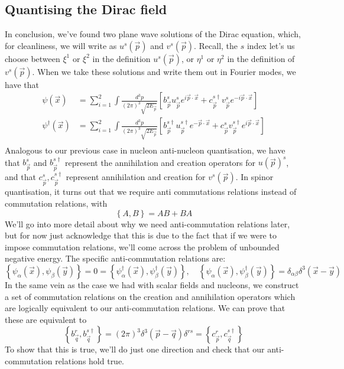 \subsection{Quantising the Dirac field}
In conclusion, we've found two 
plane wave solutions of the Dirac equation, which, for 
cleanliness, we will write as 
$ u ^ s (\vec{p} )  $ and $ v ^s ( \vec{p} )$. 
Recall, the $ s $ index let's us choose between 
$ \xi ^ 1  $  or $ \xi ^ 2 $ in the definition $ u^ s ( \vec{p} )$, 
or $ \eta ^ 1 $ or $ \eta ^ 2 $ in the definition of $  v ^ s ( \vec{p} ) $.  
When we take these solutions and write them out 
in Fourier modes, we have that 
\begin{align*}
\psi ( \vec{x} ) &=  \sum _{ i = 1 } ^ 2 
\int \frac{ d^ 3 p }{ ( 2 \pi ) ^ 3 \sqrt{ 2 E_{ \vec{p} } }  } \left[  
b_{ \vec{p} } ^ s u _{ \vec{p} } ^ s e ^{ i \vec{p} \cdot  \vec{x} } 
+ c_{ \vec{p} } ^{ s \dagger } v_{ \vec{p} } ^ s e ^{ - i \vec{p} \cdot  \vec{x}}\right] \\
\psi ^ \dagger ( \vec{x} ) &=  \sum _{ i = 1 } ^ 2 
\int \frac{ d ^ 3 p }{ ( 2 \pi ) ^ 3 \sqrt{ 2 E _{ \vec{p} } }  } \left[  
	b_{ \vec{p} } ^ { s \dagger }  u_{\vec{p} } ^{ s \dagger } e ^{ - \vec{p} \cdot  \vec{x} } + 
c_{ \vec{p} } ^ s v_{ \vec{p}} ^{ s \dagger } e ^{ i \vec{p} \cdot  \vec{x} } \right] \\ 
\end{align*}
Analogous to our previous case in 
nucleon anti-nucleon quantisation, we have that
$ b_{\vec{p} }^ s $  and $ b_{\vec{p} } ^{ s \dagger } $ 
represent the annihilation and creation 
operators for $ u( \vec{p} ) ^ s $, and that $  c_{ \vec{p} } ^ s , 
c_{ \vec{p} } ^{ s \dagger } $  represent annihilation 
and creation for $ v ^ s ( \vec{p} ) $. 
In spinor quantisation, it turns out that we require 
anti commutations relations instead of commutation relations, with 
\[
\left\{  A, B  \right\}   = AB + B A 
\] We'll go into more detail about why we 
need anti-commutation relations later, 
but for now just acknowledge that this is due to the fact that 
if we were to impose commutation relations, 
we'll come across the problem of unbounded negative energy. 
The specific anti-commutation relations are:  
\[
\left\{  \psi _ \alpha ( \vec{x} ) , \psi _ \beta ( \vec{y} )  \right\}   = 0 
= \left\{  \psi _{ \alpha } ^ \dagger ( \vec{x} ) , \psi _{ \beta } ^ \dagger 
( \vec{y} ) \right\}  , \quad \left\{  \psi _ \alpha ( \vec{x} ) , 
\psi _{ \beta }^\dagger ( \vec{y} ) \right\}  = \delta _{ \alpha \beta } \delta ^ 3 ( \vec{x} - \vec{y} ) 
\]
In the same vein as the case we 
had with scalar fields and nucleons, 
we construct a set of commutation relations on 
the creation and annihilation operators
which are logically equivalent to our anti-commutation 
relations. We can prove that these are equivalent to 
\[
\left\{  b_{ \vec{q} } ^ r , b _{ \vec{q} } ^{ s \dagger }  \right\}  = 
( 2 \pi ) ^ 3 \delta ^ 3 ( \vec{p} - \vec{q} ) \delta ^{ rs }  = \left\{  c_{ \vec{p} } ^ r , 
c _{ \vec{q} } ^{ s \dagger }\right\} 
\]
To show that this is true, we'll do just one direction 
and check that our anti-commutation relations hold true. 

